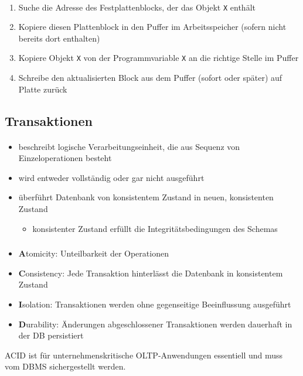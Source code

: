 \begin{frame}{\insertsection}
\framesubtitle{\insertsubsection}
\begin{enumerate}
	\item Suche die Adresse des Festplattenblocks, der das Objekt \texttt{X} enthält
	\item Kopiere diesen Plattenblock in den Puffer im Arbeitsspeicher (sofern nicht bereits dort enthalten)
	\item Kopiere Objekt \texttt{X} von der Programmvariable \texttt{X} an die richtige Stelle im Puffer
	\item Schreibe den aktualisierten Block aus dem Puffer (sofort oder später) auf Platte zurück 
\end{enumerate}
\end{frame}

\subsection{Transaktionen}
\begin{frame}{\insertsection}
\framesubtitle{\insertsubsection}
\begin{itemize}
	\item beschreibt logische Verarbeitungseinheit, die aus Sequenz von Einzeloperationen besteht
	\item wird entweder vollständig oder gar nicht ausgeführt 
	\item \"uberf\"uhrt Datenbank von konsistentem Zustand in neuen, konsistenten Zustand 
	\begin{itemize}
		\item konsistenter Zustand erf\"ullt die Integritätsbedingungen des Schemas
	\end{itemize}
\end{itemize}
\end{frame}

\begin{frame}
	\frametitle{\insertsection}
	\framesubtitle{\insertsubsection}
	\begin{itemize}
		\item \textbf{A}tomicity: Unteilbarkeit der Operationen
		\item \textbf{C}onsistency: Jede Transaktion hinterlässt die Datenbank in konsistentem Zustand
		\item \textbf{I}solation: Transaktionen werden ohne gegenseitige Beeinflussung ausgeführt
		\item \textbf{D}urability: Änderungen abgeschlossener Transaktionen werden dauerhaft in der DB persistiert
	\end{itemize}
	\vspace{1em}	
ACID ist für unternehmenskritische OLTP-Anwendungen essentiell und muss vom DBMS sichergestellt werden.	
\end{frame}

